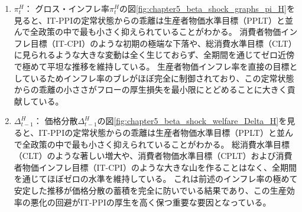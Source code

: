 \begin{enumerate}
    \item
    \label{itm:chapter5_beta_shock_policies_it_ppi_pi_H}
        \(\pi_t^H\)：
        グロス・インフレ率\(\pi_t^H\)の図\ref{fig:chapter5_beta_shock_graphs_pi_H}を見ると、IT-PPIの定常状態からの乖離は生産者物価水準目標（PPLT）と並んで全政策の中で最も小さく抑えられていることがわかる。
        消費者物価インフレ目標（IT-CPI）のような初期の極端な下落や、総消費水準目標（CLT）に見られるような大きな変動は全く生じておらず、全期間を通じてゼロ近傍で極めて平坦な推移を維持している。
        生産者物価インフレ率を直接の目標としているためインフレ率のブレがほぼ完全に制御されており、この定常状態からの乖離の小ささがフローの厚生損失を最小限にとどめることに大きく貢献している。
    \item
    \label{itm:chapter5_beta_shock_policies_it_ppi_Delta_t_minus_1_H}
        \(\Delta_{t-1}^H\)：
        価格分散\(\Delta_{t-1}^H\)の図\ref{fig:chapter5_beta_shock_welfare_Delta_H}を見ると、IT-PPIの定常状態からの乖離は生産者物価水準目標（PPLT）と並んで全政策の中で最も小さく抑えられていることがわかる。
        総消費水準目標（CLT）のような著しい増大や、消費者物価水準目標（CPLT）および消費者物価インフレ目標（IT-CPI）のような大きな山を作ることはなく、全期間を通じてほぼゼロの水準を維持している。
        これは前述のインフレ率の極めて安定した推移が価格分散の蓄積を完全に防いでいる結果であり、この生産効率の悪化の回避がIT-PPIの厚生を高く保つ重要な要因となっている。
\end{enumerate}